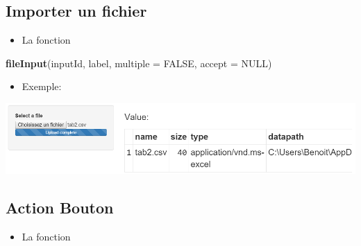 \documentclass[]{article}
\newenvironment{Shaded}{\begin{snugshade}}{\end{snugshade}}
\newcommand{\KeywordTok}[1]{\textcolor[rgb]{0.13,0.29,0.53}{\textbf{#1}}}
\newcommand{\DataTypeTok}[1]{\textcolor[rgb]{0.13,0.29,0.53}{#1}}
\newcommand{\StringTok}[1]{\textcolor[rgb]{0.31,0.60,0.02}{#1}}
\newcommand{\CommentTok}[1]{\textcolor[rgb]{0.56,0.35,0.01}{\textit{#1}}}
\newcommand{\OtherTok}[1]{\textcolor[rgb]{0.56,0.35,0.01}{#1}}
\newcommand{\NormalTok}[1]{#1}
\providecommand{\tightlist}{%
  \setlength{\itemsep}{0pt}\setlength{\parskip}{0pt}}
\begin{document}
\subsection{Importer un fichier}\label{importer-un-fichier}

\begin{itemize}
\tightlist
\item
  La fonction
\end{itemize}

\begin{Shaded}
\begin{Highlighting}[]
\KeywordTok{fileInput}\NormalTok{(inputId, label, }\DataTypeTok{multiple =} \OtherTok{FALSE}\NormalTok{, }\DataTypeTok{accept =} \OtherTok{NULL}\NormalTok{)}
\end{Highlighting}
\end{Shaded}

\begin{itemize}
\tightlist
\item
  Exemple:
\end{itemize}

\begin{Shaded}
\end{Shaded}

\includegraphics{img/file.png}

\subsection{Action Bouton}\label{action-bouton}

\begin{itemize}
\tightlist
\item
  La fonction
\end{itemize}
\end{document}
